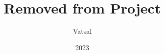 \documentclass[a4paper]{article}
\theoremstyle{definition} \newtheorem*{definition}{Definition}
\theoremstyle{definition} \newtheorem*{definitions}{Definitions}
\theoremstyle{plain} \newtheorem{theorem}{Theorem}[section]
\theoremstyle{plain} \newtheorem{proposition}[theorem]{Proposition}
\theoremstyle{plain} \newtheorem{corollary}[theorem]{Corollary}
\theoremstyle{plain} \newtheorem{lemma}[theorem]{Lemma}
\theoremstyle{plain} \newtheorem{example}[theorem]{Example}
\begin{document}
\title{Removed from Project}
\author{Vatsal}
\date{2023}
\maketitle
\end{document}
